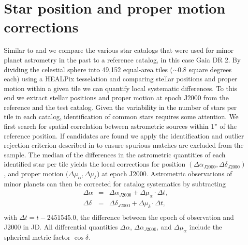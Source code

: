 \documentclass[review]{elsarticle}
\begin{document}
\section{Star position and proper motion corrections} 
\label{sec:debias}
Similar to \citet{chesley10} and \citet{farnocchia15} we compare the various star catalogs that were used for minor planet astrometry in the past to a reference catalog, in this case Gaia DR 2. 
By dividing the celestial sphere into 49,152
equal-area tiles ($\sim$0.8 square degrees each) using a HEALPix tesselation
\citep{healpix} and comparing stellar positions and proper motion within a given tile we can quantify local systematic differences.
To this end we extract stellar positions and proper motion at epoch J2000 from the reference and the test catalog.
Given the variability in the number of stars per tile in each catalog, identification of common stars requires some attention. We first search for spatial correlation between astrometric sources within  1'' of the reference position. 
If candidates are found we apply the identification and outlier rejection criterion described in \citet{farnocchia15} to
ensure spurious matches are excluded from the sample.
%
The median of the differences in the astrometric quantities of each identified star per tile yields the local corrections for position $(\Delta \alpha_{J2000}, \Delta \delta_{J2000})$, and proper motion $(\Delta \mu_{\alpha}, \Delta \mu_{\delta}$) at epoch J2000.
%
Astrometric observations of minor planets can then be corrected for catalog systematics by subtracting
 \begin{eqnarray*}
\Delta\alpha & = & \Delta \alpha_{J2000} + \Delta \mu_{\alpha} \cdot \Delta t,\\
\Delta\delta & = & \Delta \delta_{J2000} + \Delta \mu_{\delta} \cdot \Delta t,\\
\end{eqnarray*}
with $\Delta t=t - 2451545.0$, the difference between the epoch of observation and J2000 in JD.
All differential quantities $\Delta{\alpha}$, $\Delta{\alpha}_{J2000}$, and $\Delta \mu_{\alpha}$ include the spherical metric factor $\cos\delta$.
%
\end{document}
